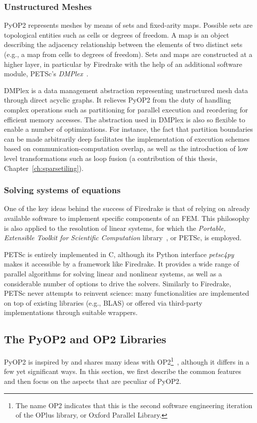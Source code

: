  \subsubsection{Unstructured Meshes}
 \label{sec:bkg:dmplex}
PyOP2 represents meshes by means of sets and fixed-arity maps. Possible sets are topological entities such as cells or degrees of freedom. A map is an object describing the adjacency relationship between the elements of two distinct sets (e.g., a map from cells to degrees of freedom). Sets and maps are constructed at a higher layer, in particular by Firedrake with the help of an additional software module, PETSc's {\em DMPlex}~\citep{dmplex-cite}. 
 
DMPlex is a data management abstraction representing unstructured mesh data through direct acyclic graphs. It relieves PyOP2 from the duty of handling complex operations such as partitioning for parallel execution and reordering for efficient memory accesses. The abstraction used in DMPlex is also so flexible to enable a number of optimizations. For instance, the fact that partition boundaries can be made arbitrarily deep facilitates the implementation of execution schemes based on communication-computation overlap, as well as the introduction of low level transformations such as loop fusion (a contribution of this thesis, Chapter~\ref{ch:sparsetiling}).
 
 \subsubsection{Solving systems of equations}
One of the key ideas behind the success of Firedrake is that of relying on already available software to implement specific components of an FEM. This philosophy is also applied to the resolution of linear systems, for which the {\em Portable, Extensible Toolkit for Scientific Computation} library~\citep{petsc-cite}, or PETSc, is employed. 

PETSc is entirely implemented in C, although its Python interface {\em petsc4py} makes it accessible by a framework like Firedrake. It provides a wide range of parallel algorithms for solving linear and nonlinear systems, as well as a considerable number of options to drive the solvers. Similarly to Firedrake, PETSc never attempts to reinvent science: many functionalities are implemented on top of existing libraries (e.g., BLAS) or offered via third-party implementations through suitable wrappers.


\subsection{The PyOP2 and OP2 Libraries}
\label{sec:bkg:op2}
PyOP2 is inspired by and shares many ideas with OP2\footnote{The name OP2 indicates that this is the second software engineering iteration of the OPlus library, or Oxford Parallel Library.}~\citep{op2-main}, although it differs in a few yet significant ways. In this section, we first describe the common features and then focus on the aspects that are peculiar of PyOP2.

